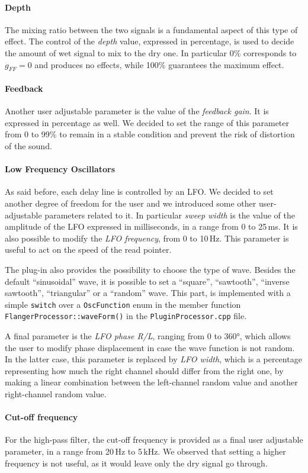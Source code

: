 \paragraph{Depth}
The mixing ratio between the two signals is a fundamental aspect of this type of effect. The control of the \emph{depth} value, expressed in percentage, is used to decide the amount of wet signal to mix to the dry one. In particular 0\% corresponds to $g_{FF} = 0$ and produces no effects, while 100\% guarantees the maximum effect.

\paragraph{Feedback}
Another user adjustable parameter is the value of the \emph{feedback gain}. It is expressed in percentage as well.
We decided to set the range of this parameter from 0 to 99\% to remain in a stable condition and prevent the risk of distortion of the sound.

\paragraph{Low Frequency Oscillators}
As said before, each delay line is controlled by an LFO.
We decided to set another degree of freedom for the user and we introduced some other user-adjustable parameters related to it.
In particular \emph{sweep width} is the value of the amplitude of the LFO expressed in milliseconds, in a range from 0 to 25\,ms.
It is also possible to modify the \emph{LFO frequency}, from 0 to 10\,Hz.
This parameter is useful to act on the speed of the read pointer.

The plug-in also provides the possibility to choose the type of wave.
Besides the default ``sinusoidal'' wave, it is possible to set a ``square'', ``sawtooth'', ``inverse sawtooth'', ``triangular'' or a ``random'' wave.
This part, is implemented with a simple \texttt{switch} over a \texttt{OscFunction} enum in the member function \texttt{FlangerProcessor::waveForm()} in the \texttt{PluginProcessor.cpp} file.

A final parameter is the \emph{LFO phase R/L}, ranging from 0 to 360°, which allows the user to modify phase displacement in case the wave function is not random. In the latter case, this parameter is replaced by \emph{LFO width}, which is a percentage representing how much the right channel should differ from the right one, by making a linear combination between the left-channel random value and another right-channel random value.

\paragraph{Cut-off frequency}
For the high-pass filter, the cut-off frequency is provided as a final user adjustable parameter, in a range from 20\,Hz to 5\,kHz. We observed that setting a higher frequency is not useful, as it would leave only the dry signal go through.